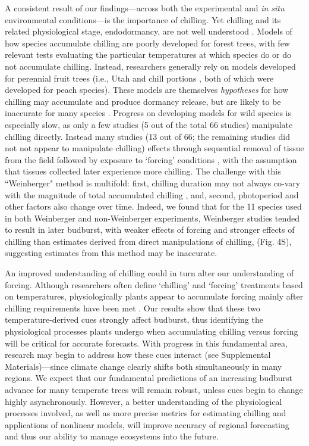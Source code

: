 \documentclass{article}
\begin{document}
\par A consistent result of our findings---across both the experimental and \emph{in situ} environmental conditions---is the importance of chilling. Yet chilling and its related physiological stage, endodormancy, are not well understood \citep{chuine2016}. Models of how species accumulate chilling are poorly developed for forest trees, with few relevant tests evaluating the particular temperatures at which species do or do not accumulate chilling. Instead, researchers generally rely on models developed for perennial fruit trees (i.e., Utah \citep{richardson1974} and chill portions \citep{fishman1987}, both of which were developed for peach species). These models are themselves \emph{hypotheses} for how chilling may accumulate and produce dormancy release, but are likely to be inaccurate for many species \citep{dennis2003}. 
Progress on developing models for wild species is especially slow, as only a few studies (5 out of the total 66 studies) manipulate chilling directly. Instead many studies (13 out of 66; the remaining studies did not not appear to manipulate chilling) effects through sequential removal of tissue from the field followed by exposure to `forcing' conditions \citep{weinberger1950} %
, with the assumption that tissues collected later experience more chilling. The challenge with this ``Weinberger" method is multifold: first, chilling duration may not always co-vary with the magnitude of total accumulated chilling \citep{dennis2003}, and, second, photoperiod and other factors also change over time. Indeed, we found that for the 11 species used in both Weinberger and non-Weinberger experiments, Weinberger studies tended to result in later budburst, with weaker effects of forcing and stronger effects of chilling than estimates derived from direct manipulations of chilling, \citep{weinberger1950,polgar2013} (Fig. 4S), suggesting estimates from this method may be inaccurate.

\par An improved understanding of chilling could in turn alter our understanding of forcing. Although researchers often define `chilling' and `forcing' treatments based on temperatures, physiologically plants appear to accumulate forcing mainly after chilling requirements have been met \citep{chuine2016}. Our results show that these two temperature-derived cues strongly affect budburst, thus identifying the physiological processes plants undergo when accumulating chilling versus forcing will be critical for accurate forecasts. With progress in this fundamental area, research may begin to address how these cues interact (see Supplemental Materials)---since climate change clearly shifts both simultaneously in many regions. We expect that our fundamental predictions of an increasing budburst advance %
for many temperate trees will remain robust, unless cues begin to change highly asynchronously. However, a better understanding of the physiological processes involved, as well as more precise metrics for estimating chilling and applications of nonlinear models, will improve accuracy of regional forecasting and thus our ability to manage ecosystems into the future.
\end{document}
